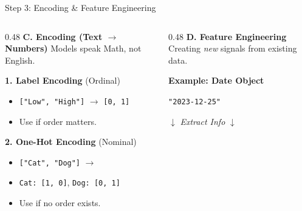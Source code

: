 \begin{frame}{Step 3: Encoding \& Feature Engineering}

    \begin{columns}[T]
        \begin{column}{0.48\textwidth}
            \textbf{C. Encoding (Text $\to$ Numbers)}
            \small Models speak Math, not English.
            \vspace{0.5em}
            
            \begin{tcolorbox}[colback=orange!5, boxrule=0pt]
                \textbf{1. Label Encoding} (Ordinal)
                \begin{itemize}
                    \item \texttt{["Low", "High"]} $\to$ \texttt{[0, 1]}
                    \item Use if order matters.
                \end{itemize}
                \vspace{0.3em}
                \textbf{2. One-Hot Encoding} (Nominal)
                \begin{itemize}
                    \item \texttt{["Cat", "Dog"]} $\to$
                    \item \texttt{Cat: [1, 0]}, \texttt{Dog: [0, 1]}
                    \item Use if no order exists.
                \end{itemize}
            \end{tcolorbox}
        \end{column}
        
        \begin{column}{0.48\textwidth}
            \textbf{D. Feature Engineering}
            \small Creating \textit{new} signals from existing data.
            \vspace{0.5em}
            
            \begin{tcolorbox}[colback=green!5, boxrule=0pt]
                \centering
                \textbf{Example: Date Object}
                \vspace{0.5em}
                
                \texttt{"2023-12-25"}
                \vspace{0.3em}
                \begin{center}
                    $\downarrow$ \textit{Extract Info} $\downarrow$
                \end{center}
                \vspace{0.3em}
                

\end{tcolorbox}
\end{column}
\end{columns}
\end{frame}
